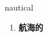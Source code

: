 
\begin{frame}
{\huge nautical}
\begin{center}
\begin{enumerate}\Large
  \item \textbf{航海的}
\end{enumerate}
\end{center}
\end{frame}
